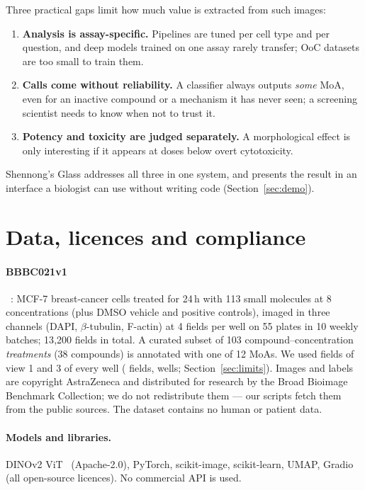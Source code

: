 \documentclass[11pt,a4paper]{article}
\begin{document}
Three practical gaps limit how much value is extracted from such images:
\begin{enumerate}
\item \textbf{Analysis is assay-specific.} Pipelines are tuned per cell type and per question,
and deep models trained on one assay rarely transfer; OoC datasets are too small to train them.
\item \textbf{Calls come without reliability.} A classifier always outputs \emph{some} MoA, even
for an inactive compound or a mechanism it has never seen; a screening scientist needs to know
when not to trust it.
\item \textbf{Potency and toxicity are judged separately.} A morphological effect is only
interesting if it appears at doses below overt cytotoxicity.
\end{enumerate}
Shennong's Glass addresses all three in one system, and presents the result in an interface a biologist
can use without writing code (Section~\ref{sec:demo}).

\section{Data, licences and compliance}
\paragraph{BBBC021v1}~\cite{caie2010,ljosa2012}: MCF-7 breast-cancer cells treated for 24\,h with
113 small molecules at 8 concentrations (plus DMSO vehicle and positive controls), imaged in
three channels (DAPI, $\beta$-tubulin, F-actin) at 4 fields per well on 55 plates in 10 weekly
batches; 13{,}200 fields in total. A curated subset of 103 compound--concentration
\emph{treatments} (38 compounds) is annotated with one of 12 MoAs. We used
fields of view 1 and 3 of every well (\NImages{} fields, \NWells{} wells; Section~\ref{sec:limits}).
Images and labels are copyright AstraZeneca and distributed for research by the Broad Bioimage
Benchmark Collection; we do not redistribute them --- our scripts fetch them from the public
sources. The dataset contains no human or patient data.
\paragraph{Models and libraries.} DINOv2 ViT~\cite{oquab2023} (Apache-2.0), PyTorch, scikit-image,
scikit-learn, UMAP, Gradio (all open-source licences). No commercial API is used.
\end{document}
